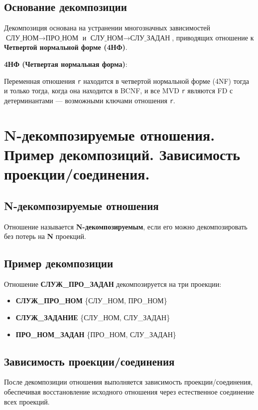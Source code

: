 \documentclass[a4paper,12pt]{article}
\begin{document}
\subsection{Основание декомпозиции}

Декомпозиция основана на устранении многозначных зависимостей \(\mathbf{\text{СЛУ\_НОМ} \rightarrow \text{ПРО\_НОМ}}\) и \(\mathbf{\text{СЛУ\_НОМ} \rightarrow \text{СЛУ\_ЗАДАН}}\), приводящих отношение к \textbf{Четвертой нормальной форме (4НФ)}.

\textbf{4НФ (Четвертая нормальная форма)}:

Переменная отношения \texttt{r} находится в четвертой нормальной форме (4NF) тогда и только тогда, когда она находится в BCNF, и все MVD \texttt{r} являются FD с детерминантами — возможными ключами отношения \texttt{r}.

\section{N-декомпозируемые отношения. Пример декомпозиций. Зависимость проекции/соединения.}

\subsection{N-декомпозируемые отношения}

Отношение называется \textbf{N-декомпозируемым}, если его можно декомпозировать без потерь на \textbf{N} проекций.

\subsection{Пример декомпозиции}

Отношение \textbf{СЛУЖ\_ПРО\_ЗАДАН} декомпозируется на три проекции:
\begin{itemize}
    \item \textbf{СЛУЖ\_ПРО\_НОМ} \{СЛУ\_НОМ, ПРО\_НОМ\}
    \item \textbf{СЛУЖ\_ЗАДАНИЕ} \{СЛУ\_НОМ, СЛУ\_ЗАДАН\}
    \item \textbf{ПРО\_НОМ\_ЗАДАН} \{ПРО\_НОМ, СЛУ\_ЗАДАН\}
\end{itemize}

\subsection{Зависимость проекции/соединения}

После декомпозиции отношения выполняется зависимость проекции/соединения, обеспечивая восстановление исходного отношения через естественное соединение всех проекций.
\end{document}
